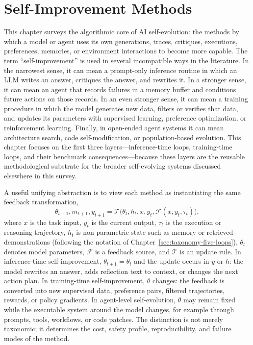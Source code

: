 
\section{Self-Improvement Methods}
\label{sec:self-improvement-methods}

This chapter surveys the algorithmic core of AI self-evolution: the methods by which a model or agent uses its own generations, traces, critiques, executions, preferences, memories, or environment interactions to become more capable. The term ``self-improvement'' is used in several incompatible ways in the literature. In the narrowest sense, it can mean a prompt-only inference routine in which an LLM writes an answer, critiques the answer, and rewrites it. In a stronger sense, it can mean an agent that records failures in a memory buffer and conditions future actions on those records. In an even stronger sense, it can mean a training procedure in which the model generates new data, filters or verifies that data, and updates its parameters with supervised learning, preference optimization, or reinforcement learning. Finally, in open-ended agent systems it can mean architecture search, code self-modification, or population-based evolution. This chapter focuses on the first three layers---inference-time loops, training-time loops, and their benchmark consequences---because these layers are the reusable methodological substrate for the broader self-evolving systems discussed elsewhere in this survey.

A useful unifying abstraction is to view each method as instantiating the same feedback transformation,
\begin{equation}
    \theta_{t+1}, m_{t+1}, y_{t+1}
    = \mathcal{T}\bigl(\theta_t, h_t, x, y_t, \mathcal{F}(x,y_t,\tau_t)\bigr),
    \label{eq:generic-self-improvement}
\end{equation}
where $x$ is the task input, $y_t$ is the current output, $\tau_t$ is the execution or reasoning trajectory, $h_t$ is non-parametric state such as memory or retrieved demonstrations (following the notation of Chapter~\ref{sec:taxonomy-five-loops}), $\theta_t$ denotes model parameters, $\mathcal{F}$ is a feedback source, and $\mathcal{T}$ is an update rule. In inference-time self-improvement, $\theta_{t+1}=\theta_t$ and the update occurs in $y$ or $h$: the model rewrites an answer, adds reflection text to context, or changes the next action plan. In training-time self-improvement, $\theta$ changes: the feedback is converted into new supervised data, preference pairs, filtered trajectories, rewards, or policy gradients. In agent-level self-evolution, $\theta$ may remain fixed while the executable system around the model changes, for example through prompts, tools, workflows, or code patches. The distinction is not merely taxonomic; it determines the cost, safety profile, reproducibility, and failure modes of the method.

